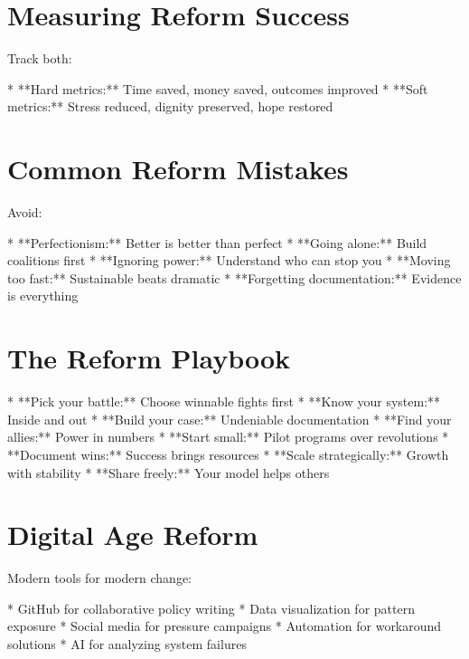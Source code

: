 \documentclass[12pt,oneside]{book}
\begin{document}
\section{Measuring Reform Success}

Track both:

                    * **Hard metrics:** Time saved, money saved, outcomes improved
                    * **Soft metrics:** Stress reduced, dignity preserved, hope restored

\section{Common Reform Mistakes}

Avoid:

                    * **Perfectionism:** Better is better than perfect
                    * **Going alone:** Build coalitions first
                    * **Ignoring power:** Understand who can stop you
                    * **Moving too fast:** Sustainable beats dramatic
                    * **Forgetting documentation:** Evidence is everything

\section{The Reform Playbook}

                    * **Pick your battle:** Choose winnable fights first
                    * **Know your system:** Inside and out
                    * **Build your case:** Undeniable documentation
                    * **Find your allies:** Power in numbers
                    * **Start small:** Pilot programs over revolutions
                    * **Document wins:** Success brings resources
                    * **Scale strategically:** Growth with stability
                    * **Share freely:** Your model helps others

\section{Digital Age Reform}

Modern tools for modern change:

                    * GitHub for collaborative policy writing
                    * Data visualization for pattern exposure
                    * Social media for pressure campaigns
                    * Automation for workaround solutions
                    * AI for analyzing system failures
\end{document}
